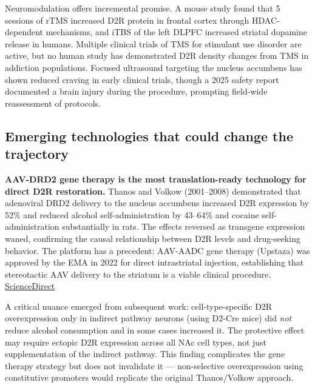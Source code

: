 Neuromodulation offers incremental promise. A mouse study found that 5 sessions of rTMS increased D2R protein in frontal cortex through HDAC-dependent mechanisms, and iTBS of the left DLPFC increased striatal dopamine release in humans. Multiple clinical trials of TMS for stimulant use disorder are active, but no human study has demonstrated D2R density changes from TMS in addiction populations. Focused ultrasound targeting the nucleus accumbens has shown reduced craving in early clinical trials, though a 2025 safety report documented a brain injury during the procedure, prompting field-wide reassessment of protocols.

\subsection{Emerging technologies that could change the trajectory}\label{15_d2_downregulation-emerging-technologies-that-could-change-the-trajectory}

\textbf{AAV-DRD2 gene therapy is the most translation-ready technology for direct D2R restoration.} Thanos and Volkow (2001--2008) demonstrated that adenoviral DRD2 delivery to the nucleus accumbens increased D2R expression by 52\% and reduced alcohol self-administration by 43--64\% and cocaine self-administration substantially in rats. The effects reversed as transgene expression waned, confirming the causal relationship between D2R levels and drug-seeking behavior. The platform has a precedent: AAV-AADC gene therapy (Upstaza) was approved by the EMA in 2022 for direct intrastriatal injection, establishing that stereotactic AAV delivery to the striatum is a viable clinical procedure. \href{https://www.sciencedirect.com/science/article/pii/S2329050123000633}{ScienceDirect}

A critical nuance emerged from subsequent work: cell-type-specific D2R overexpression only in indirect pathway neurons (using D2-Cre mice) did \emph{not} reduce alcohol consumption and in some cases increased it. The protective effect may require ectopic D2R expression across all NAc cell types, not just supplementation of the indirect pathway. This finding complicates the gene therapy strategy but does not invalidate it --- non-selective overexpression using constitutive promoters would replicate the original Thanos/Volkow approach.

